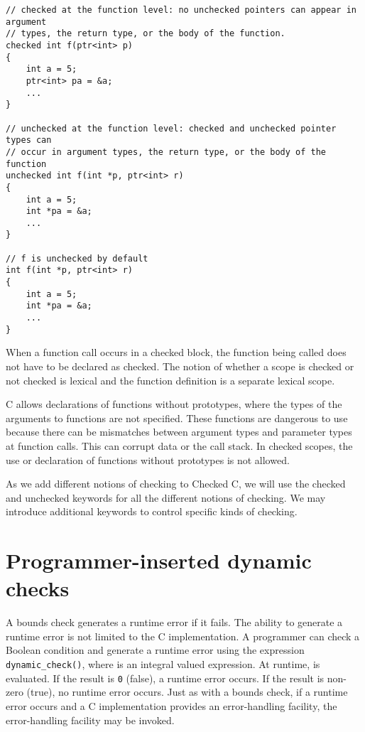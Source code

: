 \begin{verbatim}
// checked at the function level: no unchecked pointers can appear in argument
// types, the return type, or the body of the function.
checked int f(ptr<int> p) 
{
    int a = 5;
    ptr<int> pa = &a;
    ...
}

// unchecked at the function level: checked and unchecked pointer types can
// occur in argument types, the return type, or the body of the function
unchecked int f(int *p, ptr<int> r)
{
    int a = 5;
    int *pa = &a;
    ...
}

// f is unchecked by default
int f(int *p, ptr<int> r)
{
    int a = 5;
    int *pa = &a;
    ...
}
\end{verbatim}

When a function call occurs in a checked block, the function being
called does not have to be declared as checked. The notion of whether a
scope is checked or not checked is lexical and the function definition
is a separate lexical scope.

C allows declarations of functions without prototypes, where the types 
of the arguments to functions are not specified.  These
functions are dangerous to use because there can be mismatches 
between argument types and parameter types at function
calls.  This can corrupt data or the call stack.  In checked scopes, 
the use or declaration of  functions without prototypes is not allowed.

As we add different notions of checking to Checked C, we will use the
checked and unchecked keywords for all the different notions of
checking. We may introduce additional keywords to control specific kinds
of checking.

\section{Programmer-inserted dynamic checks}
\label{section:programmer-dynamic-checks}

A bounds check generates a runtime error if it fails. The ability to
generate a runtime error is not limited to the C implementation. A
programmer can check a Boolean condition and generate a runtime error
using the expression \texttt{dynamic\_check(}\texttt{)}, where
 is an integral valued expression. At runtime,  is
evaluated. If the result is \texttt{0} (false), a runtime error occurs.
If the result is non-zero (true), no runtime error occurs. Just as with
a bounds check, if a runtime error occurs and a C implementation
provides an error-handling facility, the error-handling facility may be
invoked.

